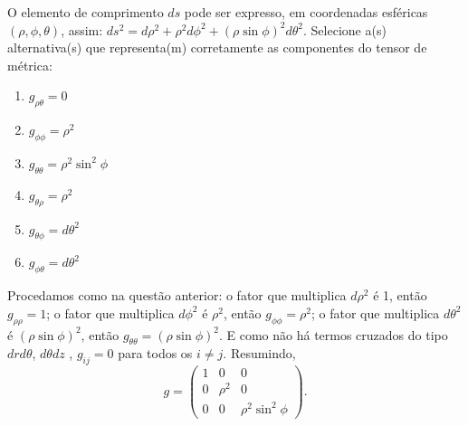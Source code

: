 \begin{question}
    O elemento de comprimento $ds$ pode ser expresso, em coordenadas esféricas $(\rho, \phi, \theta)$, assim: $ds^2 = d\rho^2 + \rho^2 d\phi^2 + (\rho\sin\phi)^2 d\theta^2$.
    Selecione a(s) alternativa(s) que representa(m) corretamente as componentes do tensor de métrica:
    \begin{enumerate}
      \item $g_{\rho\theta} = 0$ \rightanswer
      \item $g_{\phi\phi} = \rho^2$ \rightanswer
      \item $g_{\theta\theta} = \rho^2 \sin^2 \phi$ \rightanswer
      \item $g_{\theta \rho} = \rho^2$
      \item $g_{\theta\phi} = d\theta^2$
      \item $g_{\phi\theta} = d\theta^2$
    \end{enumerate}

    \begin{solution}
      Procedamos como na questão anterior: o fator que multiplica $d\rho^2$ é 1, então $g_{\rho\rho} = 1$;
      o fator que multiplica $d\phi^2$ é $\rho^2$, então $g_{\phi\phi} = \rho^2$;
      o fator que multiplica $d\theta^2$ é $(\rho\sin\phi)^2$, então $g_{\theta\theta} = (\rho\sin\phi)^2$.
      E como não há termos cruzados do tipo $dr d\theta$, $d\theta dz$ \etc, $g_{ij} = 0$ para todos os $i \ne j$.
      Resumindo,
      \begin{equation*}
        g = \begin{pmatrix}
          1 &      0   &                0 \\
          0 & \rho^2 &                  0 \\
          0 &      0   & \rho^2\sin^2\phi
        \end{pmatrix}.
      \end{equation*}
    \end{solution}
\end{question}